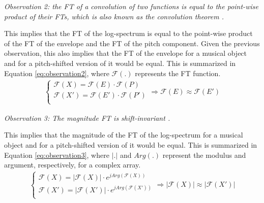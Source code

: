 \documentclass[journal]{IEEEtran}
\begin{document}
\emph{Observation 2: the FT of a convolution of two functions is equal to the point-wise product of their FTs, which is also known as the convolution theorem \cite{proakis1995}.}

This implies that the FT of the log-spectrum is equal to the point-wise product of the FT of the envelope and the FT of the pitch component. Given the previous observation, this also implies that the FT of the envelope for a musical object and for a pitch-shifted version of it would be equal. This is summarized in Equation \ref{eq:observation2}, where $\mathcal{F}(.)$ represents the FT function.
\begin{equation}
\label{eq:observation2}
\begin{split}
\begin{cases}
\mathcal{F}(X) = \mathcal{F}(E) \cdot \mathcal{F}(P) \\
\mathcal{F}(X') = \mathcal{F}(E') \cdot \mathcal{F}(P') \\
\end{cases}
\Rightarrow \mathcal{F}(E) \approx \mathcal{F}(E')
\end{split}
\end{equation}

\emph{Observation 3: The magnitude FT is shift-invariant \cite{proakis1995}.}

This implies that the magnitude of the FT of the log-spectrum for a musical object and for a pitch-shifted version of it would be equal. This is summarized in Equation \ref{eq:observation3}, where $|.|$ and $Arg(.)$ represent the modulus and argument, respectively, for a complex array. 
\begin{equation}
\label{eq:observation3}
\begin{split}
\begin{cases}
\mathcal{F}(X) = |\mathcal{F}(X)| \cdot e^{j Arg(\mathcal{F}(X))} \\
\mathcal{F}(X') = |\mathcal{F}(X')| \cdot e^{j Arg(\mathcal{F}(X'))} \\
\end{cases}
\Rightarrow |\mathcal{F}(X)| \approx |\mathcal{F}(X')|
\end{split}
\end{equation}
\end{document}
